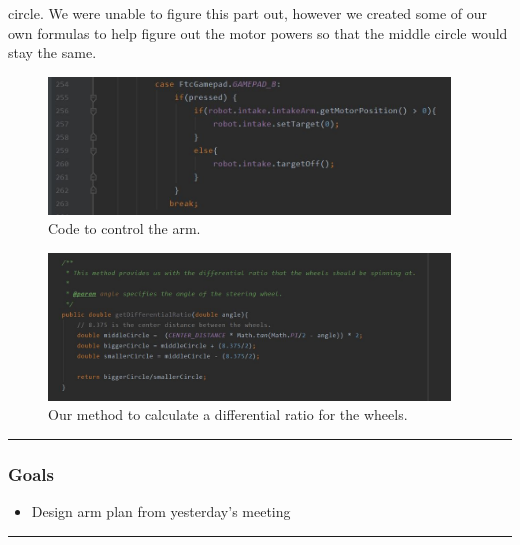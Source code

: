 circle. We were unable to figure this part out, however we created some of our own formulas to help figure out the motor powers so that the middle circle would stay the same.

\begin{figure}[htp]
\centering
\includegraphics[width=0.95\textwidth, angle=0]{Meetings/October/10-29-21/armForcefield - Ritam R.JPG}
\caption{Code to control the arm.}
\label{fig:pic1}
\end{figure}

\begin{figure}[htp]
\centering
\includegraphics[width=0.95\textwidth, angle=0]{Meetings/October/10-29-21/getDifferentialRatio - Ritam R.JPG}
\caption{Our method to calculate a differential ratio for the wheels.}
\label{fig:pic2}
\end{figure}


\noindent\hfil\rule{\textwidth}{.4pt}\hfil
\subsubsection*{Goals}
\begin{itemize}
    \item Design arm plan from yesterday’s meeting

\end{itemize} 

\noindent\hfil\rule{\textwidth}{.4pt}\hfil


